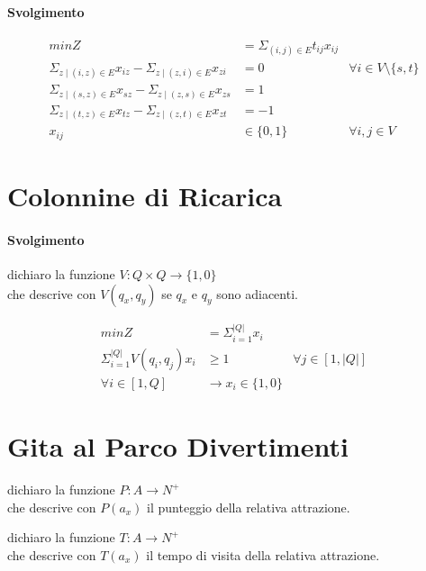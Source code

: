 \paragraph{Svolgimento}

\begin{align*}
    min Z &= \Sigma _{(i,j) \in E} t_{ij} x_{ij} \\
    \Sigma _{z \mid (i,z) \in E} x_{iz} - \Sigma _{z \mid (z,i) \in E} x_{zi} &= 0 &\forall i \in V \setminus \{s,t\} \\
    \Sigma _{z \mid (s,z) \in E} x_{sz} - \Sigma _{z \mid (z,s) \in E} x_{zs} &= 1 \\
    \Sigma _{z \mid (t,z) \in E} x_{tz} - \Sigma _{z \mid (z,t) \in E} x_{zt} &= -1 \\
    x_{ij} &\in \{0,1\} &\forall i,j \in V
\end{align*}

\section{Colonnine di Ricarica}

\paragraph{Svolgimento}

dichiaro la funzione $V : Q \times Q \rightarrow \{1,0\}$ \\
che descrive con $V(q_x, q_y)$ se $q_x$ e $q_y$ sono adiacenti.

\begin{align*}
    min Z &= \Sigma ^ {|Q|} _ {i=1} x_i \\
    \Sigma ^ {|Q|} _ {i=1} V(q_i, q_j) x_i &\geq 1 &\forall j \in [1, |Q|] \\
    \forall i \in [1,Q] &\rightarrow x_i \in \{1,0\}
\end{align*}

\section{Gita al Parco Divertimenti}

dichiaro la funzione $P : A \rightarrow N^{+}$ \\
che descrive con $P(a_x)$ il punteggio della relativa attrazione.

dichiaro la funzione $T : A \rightarrow N^{+}$ \\
che descrive con $T(a_x)$ il tempo di visita della relativa attrazione.

